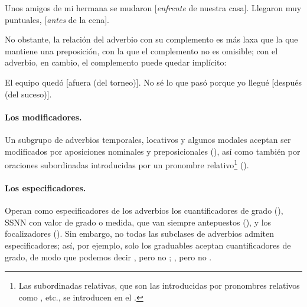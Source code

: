 \begin{exe}
  \ex
    \begin{xlist}
      \ex Unos amigos de mi hermana se mudaron [\textit{enfrente} de nuestra
          casa].
      \ex Llegaron muy puntuales, [\textit{antes} de la cena].
    \end{xlist}
\end{exe}

No obstante, la relación del adverbio con su complemento es más laxa que la que
mantiene una preposición, con la que el complemento no es omisible; con el
adverbio, en cambio, el complemento puede quedar implícito:

\begin{exe}
  \ex
    \begin{xlist}
      \ex El equipo quedó [afuera (del torneo)].
      \ex No sé lo que pasó porque yo llegué [después (del suceso)].
    \end{xlist}
\end{exe}

\paragraph{Los modificadores.} Un subgrupo de adverbios temporales, locativos y
algunos modales aceptan ser modificados por aposiciones nominales y
preposicionales (), así como también por
oraciones subordinadas introducidas por un pronombre relativo\footnote{Las
subordinadas relativas, que son las introducidas por pronombres relativos como
, etc., se introducen en el .}
().

\paragraph{Los especificadores.} Operan como especificadores de los adverbios
los cuantificadores de grado (), SSNN con
valor de grado o medida, que van siempre antepuestos (), y los focalizadores
(). Sin embargo, no todas las subclases de
adverbios admiten especificadores; así, por ejemplo, solo los graduables
aceptan cuantificadores de grado, de modo que podemos decir , pero no ; , pero no .

